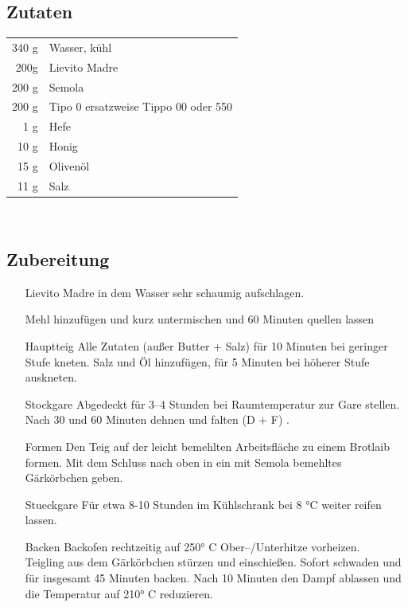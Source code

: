 \subsection*{Zutaten}
\begin{tabular}{r l}
    340 g & Wasser, kühl         \\
    200g & Lievito Madre \\
    200 g & Semola  \\
    200 g & Tipo 0 ersatzweise Tippo 00 oder 550 \\
    1 g & Hefe     \\
    10 g & Honig            \\
    15 g & Olivenöl \\
    11 g & Salz                  
\end{tabular}\\

\subsection*{Zubereitung}
\begin{enumerate}
    \item [Lievito Madre] in dem Wasser sehr schaumig aufschlagen.
    \item [\GLS{Fermentolyse}] Mehl hinzufügen und kurz untermischen und 60 Minuten quellen lassen
    
    \item  [\Gls{Hauptteig}]  Alle Zutaten (außer Butter + Salz) für 10 Minuten bei geringer Stufe kneten. Salz und Öl hinzufügen, für 5 Minuten bei höherer Stufe auskneten.
    \item [\Gls{Stockgare}] Abgedeckt für 3–4 Stunden bei Raumtemperatur zur Gare stellen. Nach 30 und 60 Minuten dehnen und falten (D + F) . 
    \item [\Gls{Formen}] Den Teig auf der leicht bemehlten Arbeitsfläche zu einem Brotlaib formen. Mit dem Schluss nach oben in ein mit Semola bemehltes Gärkörbchen geben.
    \item [\Gls{Stueckgare}]  Für etwa 8-10 Stunden im Kühlschrank bei 8 °C weiter reifen lassen.
    \item [\Gls{Backen}] Backofen rechtzeitig auf 250° C Ober–/Unterhitze vorheizen.\\
    Teigling aus dem Gärkörbchen stürzen und einschießen. Sofort schwaden und für insgesamt 45
    Minuten backen. Nach 10 Minuten den Dampf ablassen und die Temperatur auf 210° C reduzieren.
\end{enumerate}


